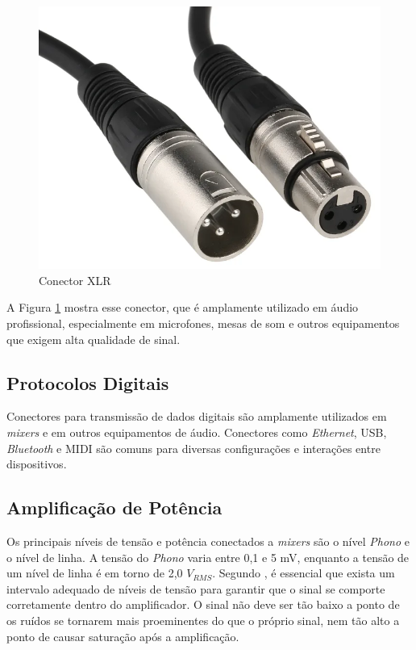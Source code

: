 \begin{figure}[h]
	\centering
    \includegraphics[scale=0.2]{figuras/fig23.png}
	\caption{Conector XLR}
	\label{fig23}
\end{figure}

A Figura \ref{fig23} mostra esse conector, que é amplamente utilizado em áudio profissional, especialmente em microfones, mesas de som e outros equipamentos que exigem alta qualidade de sinal.

\subsection{Protocolos Digitais}

Conectores para transmissão de dados digitais são amplamente utilizados em \textit{mixers} e em outros equipamentos de áudio. Conectores como \textit{Ethernet}, USB, \textit{Bluetooth} e MIDI são comuns para diversas configurações e interações entre dispositivos.

\subsection{Amplificação de Potência}

Os principais níveis de tensão e potência conectados a \textit{mixers} são o nível \textit{Phono} e o nível de linha. A tensão do \textit{Phono} varia entre 0,1 e 5 mV, enquanto a tensão de um nível de linha é em torno de 2,0 $V_{RMS}$. Segundo \cite{self2013audio}, é essencial que exista um intervalo adequado de níveis de tensão para garantir que o sinal se comporte corretamente dentro do amplificador. O sinal não deve ser tão baixo a ponto de os ruídos se tornarem mais proeminentes do que o próprio sinal, nem tão alto a ponto de causar saturação após a amplificação. 

